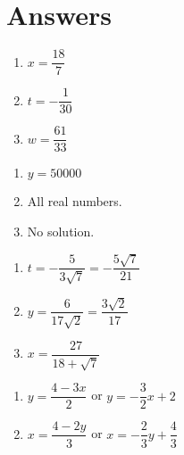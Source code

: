 \documentclass[11pt]{article}
\theoremstyle{definition}  %
\newcounter{HW}
\begin{document}
\newpage

\section{Answers}

\begin{multicols}{3}
\begin{enumerate}

\item $x = \dfrac{18}{7}$
\item $t = -\dfrac{1}{30}$
\item $w = \dfrac{61}{33}$

\setcounter{HW}{\value{enumi}}
\end{enumerate}
\end{multicols}

\begin{multicols}{3}
\begin{enumerate}
\setcounter{enumi}{\value{HW}}

\item  $y = 50000$
\item  All real numbers.
\item  No solution.

\setcounter{HW}{\value{enumi}}
\end{enumerate}
\end{multicols}


\begin{multicols}{3}
\begin{enumerate}
\setcounter{enumi}{\value{HW}}

\item  $t = -\dfrac{5}{3\sqrt{7}} = -\dfrac{5\sqrt{7}}{21}$
\item  $y = \dfrac{6}{17\sqrt{2}}  = \dfrac{3 \sqrt{2}}{17}$
\item  $x = \dfrac{27}{18+\sqrt{7}}$

\setcounter{HW}{\value{enumi}}
\end{enumerate}
\end{multicols}

\begin{multicols}{2}
\begin{enumerate}
\setcounter{enumi}{\value{HW}}
\item  $y = \dfrac{4 - 3x}{2}$ or $y = -\dfrac{3}{2}x + 2$
\item  $x = \dfrac{4 - 2y}{3}$ or $x = -\dfrac{2}{3} y + \dfrac{4}{3}$
\setcounter{HW}{\value{enumi}}
\end{enumerate}
\end{multicols}
\end{document}

